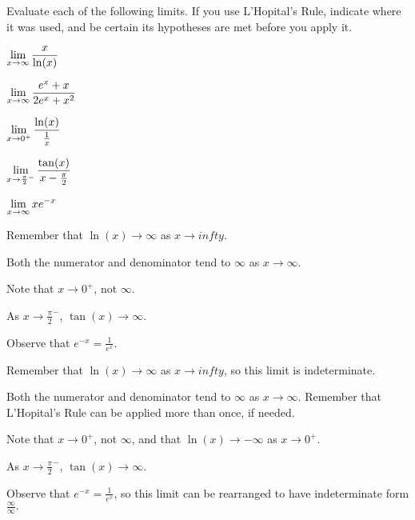 \begin{activity} \label{A:3.7.3}  
Evaluate each of the following limits.  If you use L'Hopital's Rule, indicate where it was used, and be certain its hypotheses are met before you apply it.
\ba
  \item $\displaystyle \lim_{x \to \infty} \frac{x}{\ln(x)}$  
  \item $\displaystyle \lim_{x \to \infty} \frac{e^{x} + x}{2e^{x} + x^2}$ 
  \item $\displaystyle \lim_{x \to 0^+} \frac{\ln(x)}{\frac{1}{x}}$  
  \item $\displaystyle \lim_{x \to \frac{\pi}{2}^-} \frac{\tan(x)}{x-\frac{\pi}{2}}$
  \item $\displaystyle \lim_{x \to \infty} xe^{-x}$
\ea
\end{activity}
\begin{smallhint}
\ba
	\item Remember that $\ln(x) \to \infty$ as $x \to infty$.
	\item Both the numerator and denominator tend to $\infty$ as $x \to \infty$.
	\item Note that $x \to 0^+$, not $\infty$.
	\item As $x \to \frac{\pi}{2}^-$, $\tan(x) \to \infty$.
	\item Observe that $e^{-x} = \frac{1}{e^x}$.
\ea
\end{smallhint}
\begin{bighint}
\ba
	\item Remember that $\ln(x) \to \infty$ as $x \to infty$, so this limit is indeterminate.
	\item Both the numerator and denominator tend to $\infty$ as $x \to \infty$.  Remember that L'Hopital's Rule can be applied more than once, if needed.
	\item Note that $x \to 0^+$, not $\infty$, and that $\ln(x) \to -\infty$ as $x \to 0^+$.
	\item As $x \to \frac{\pi}{2}^-$, $\tan(x) \to \infty$.  
	\item Observe that $e^{-x} = \frac{1}{e^x}$, so this limit can be rearranged to have indeterminate form $\frac{\infty}{\infty}.$
\ea
\end{bighint}
